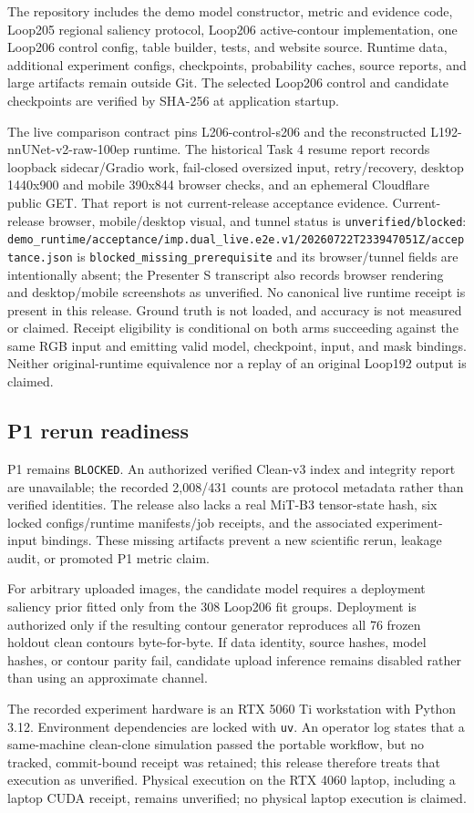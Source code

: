 The repository includes the demo model constructor, metric and evidence code, Loop205 regional saliency protocol, Loop206 active-contour implementation, one Loop206 control config, table builder, tests, and website source. Runtime data, additional experiment configs, checkpoints, probability caches, source reports, and large artifacts remain outside Git. The selected Loop206 control and candidate checkpoints are verified by SHA-256 at application startup.

The live comparison contract pins L206-control-s206 and the reconstructed L192-nnUNet-v2-raw-100ep runtime. The historical Task 4 resume report records loopback sidecar/Gradio work, fail-closed oversized input, retry/recovery, desktop 1440x900 and mobile 390x844 browser checks, and an ephemeral Cloudflare public GET. That report is not current-release acceptance evidence. Current-release browser, mobile/desktop visual, and tunnel status is \texttt{unverified/blocked}: \texttt{demo\_runtime/acceptance/imp.dual\_live.e2e.v1/20260722T233947051Z/acceptance.json} is \texttt{blocked\_missing\_prerequisite} and its browser/tunnel fields are intentionally absent; the Presenter S transcript also records browser rendering and desktop/mobile screenshots as unverified. No canonical live runtime receipt is present in this release. Ground truth is not loaded, and accuracy is not measured or claimed. Receipt eligibility is conditional on both arms succeeding against the same RGB input and emitting valid model, checkpoint, input, and mask bindings. Neither original-runtime equivalence nor a replay of an original Loop192 output is claimed.

\subsection{P1 rerun readiness}

P1 remains \texttt{BLOCKED}. An authorized verified Clean-v3 index and integrity report are unavailable; the recorded 2,008/431 counts are protocol metadata rather than verified identities. The release also lacks a real MiT-B3 tensor-state hash, six locked configs/runtime manifests/job receipts, and the associated experiment-input bindings. These missing artifacts prevent a new scientific rerun, leakage audit, or promoted P1 metric claim.

For arbitrary uploaded images, the candidate model requires a deployment saliency prior fitted only from the 308 Loop206 fit groups. Deployment is authorized only if the resulting contour generator reproduces all 76 frozen holdout clean contours byte-for-byte. If data identity, source hashes, model hashes, or contour parity fail, candidate upload inference remains disabled rather than using an approximate channel.

The recorded experiment hardware is an RTX 5060 Ti workstation with Python 3.12. Environment dependencies are locked with \texttt{uv}. An operator log states that a same-machine clean-clone simulation passed the portable workflow, but no tracked, commit-bound receipt was retained; this release therefore treats that execution as unverified. Physical execution on the RTX 4060 laptop, including a laptop CUDA receipt, remains unverified; no physical laptop execution is claimed.
